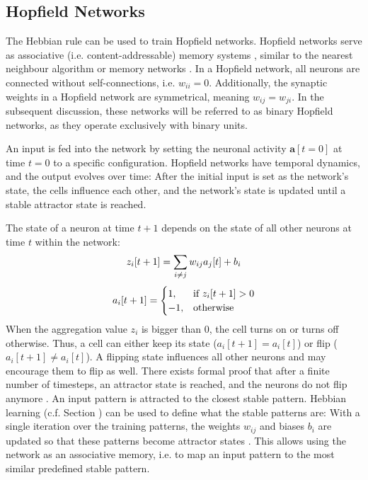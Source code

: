 \subsection{Hopfield Networks}
The Hebbian rule can be used to train Hopfield networks.
Hopfield networks serve as associative (i.e. content-addressable) memory systems , similar to the nearest neighbour algorithm  or memory networks \cite{weston_memory_2015}.
In a Hopfield network, all neurons are connected without self-connections, i.e. $w_{ii}=0$.
Additionally, the synaptic weights in a Hopfield network are symmetrical, meaning \(w_{ij} = w_{ji}\).
In the subsequent discussion, these networks will be referred to as binary Hopfield networks, as they operate exclusively with binary units.

An input is fed into the network by setting the neuronal activity $\boldsymbol{a}[t=0]$ at time $t=0$ to a specific configuration.
Hopfield networks have temporal dynamics, and the output evolves over time: After the initial input is set as the network's state, the cells influence each other, and the network's state is updated until a stable attractor state is reached.

The state of a neuron at time $t+1$ depends on the state of all other neurons at time $t$ within the network:
%
\begin{align}\eqlbl{hf_1}
	z_i[t+1] = \sum_{i \neq j} w_{ij} a_j[t] + b_i
\end{align}
%
\begin{align}\eqlbl{hf_2}
	a_i[t+1] = \begin{cases}
      		1, & \text{if } z_i[t+1] > 0 \\
      		-1, & \text{otherwise}
    	\end{cases}
\end{align}
%
When the aggregation value $z_i$ is bigger than $0$, the cell turns on or turns off otherwise.
Thus, a cell can either keep its state ($a_i[t+1] = a_i[t]$) or flip ($a_i[t+1] \neq a_i[t]$).
A flipping state influences all other neurons and may encourage them to flip as well.
There exists formal proof that after a finite number of timesteps, an attractor state is reached, and the neurons do not flip anymore .
An input pattern is attracted to the closest stable pattern.
Hebbian learning (c.f. Section ) can be used to define what the stable patterns are:
With a single iteration over the training patterns, the weights $w_{ij}$ and biases $b_i$ are updated so that these patterns become attractor states .
This allows using the network as an associative memory, i.e. to map an input pattern to the most similar predefined stable pattern.


